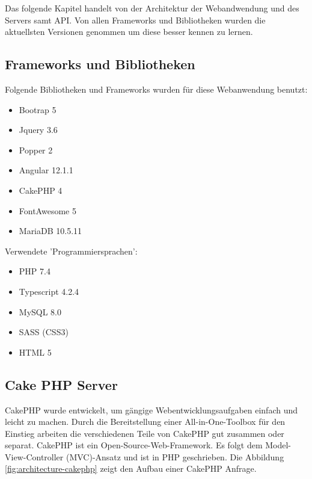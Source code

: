 \documentclass[12pt]{article}
\begin{document}
Das folgende Kapitel handelt von der Architektur der Webandwendung und des Servers samt API. Von allen Frameworks und Bibliotheken wurden die aktuellsten Versionen genommen um diese besser kennen zu lernen. 

        \subsection{Frameworks und Bibliotheken}
            Folgende Bibliotheken und Frameworks wurden für diese Webanwendung benutzt:
            \begin{itemize}
                \item Bootrap 5
                \item Jquery 3.6
                \item Popper 2
                \item Angular 12.1.1
                \item CakePHP 4
                \item FontAwesome 5
                \item MariaDB 10.5.11
            \end{itemize}
            Verwendete 'Programmiersprachen':
            \begin{itemize}
                \item PHP 7.4
                \item Typescript 4.2.4
                \item MySQL 8.0
                \item SASS (CSS3)
                \item HTML 5
            \end{itemize}
        
        \subsection{Cake PHP Server}

CakePHP wurde entwickelt, um gängige Webentwicklungsaufgaben einfach und leicht zu machen. Durch die Bereitstellung einer All-in-One-Toolbox für den Einstieg arbeiten die verschiedenen Teile von CakePHP gut zusammen oder separat. CakePHP ist ein Open-Source-Web-Framework. Es folgt dem Model-View-Controller (MVC)-Ansatz und ist in PHP geschrieben. Die Abbildung \ref{fig:architecture-cakephp} zeigt den Aufbau einer CakePHP Anfrage.
\end{document}
